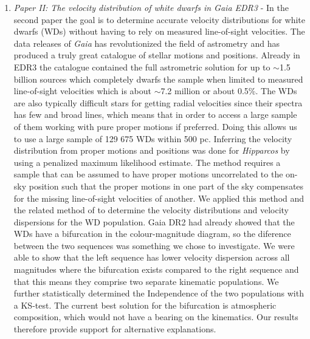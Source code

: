 \begin{enumerate}
    \item \textit{Paper II: The velocity distribution of white dwarfs in Gaia EDR3} - In the second paper the goal is to determine accurate velocity distributions for white dwarfs (WDs) without having to rely on measured line-of-sight velocities. The data releases of \textit{Gaia} has revolutionized the field of astrometry and has produced a truly great catalogue of stellar motions and positions. Already in EDR3 the catalogue contained the full astrometric solution for up to ${\sim}$1.5 billion sources which completely dwarfs the sample when limited to measured line-of-sight velocities which is about ${\sim}$7.2 million or about 0.5\%. The WDs are also typically difficult stars for getting radial velocities since their spectra has few and broad lines, which means that in order to access a large sample of them working with pure proper motions if preferred. Doing this allows us to use a large sample of 129 675 WDs within 500 pc. Inferring the velocity distribution from proper motions and positions was done for \textit{Hipparcos} by \cite{dehnen:98a} using a penalized maximum likelihood estimate. The method requires a sample that can be assumed to have proper motions uncorrelated to the on-sky position such that the proper motions in one part of the sky compensates for the missing line-of-sight velocities of another. We applied this method and the related method of \cite{dehnen:98b} to determine the velocity distributions and velocity dispersions for the WD population. Gaia DR2 had already showed that the WDs have a bifurcation in the colour-magnitude diagram, so the diference between the two sequences was something we chose to investigate. We were able to show that the left sequence has lower velocity dispersion across all magnitudes where the bifurcation exists compared to the right sequence and that this means they comprise two separate kinematic populations. We further statistically determined the Independence of the two populations with a KS-test. The current best solution for the bifurcation is atmospheric composition, which would not have a bearing on the kinematics. Our results therefore provide support for alternative explanations. 
        

\end{enumerate}
